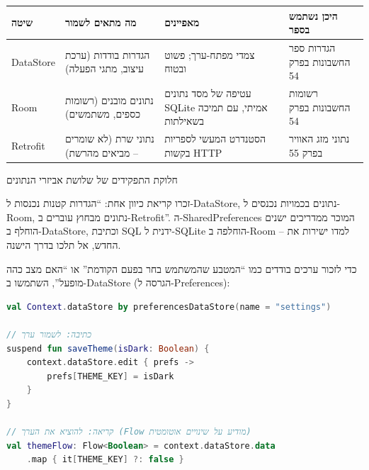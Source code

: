 


\begin{center}
\begin{tabularx}{\linewidth}{|X|X|X|X|}
\hline
\textbf{שיטה} & \textbf{מה מתאים לשמור} & \textbf{מאפיינים} & \textbf{היכן נשתמש בספר} \tabularnewline
\hline
DataStore & הגדרות בודדות (ערכת עיצוב, מתגי הפעלה) & צמדי מפתח-ערך; פשוט ובטוח & הגדרות ספר החשבונות בפרק 54 \tabularnewline
Room & נתונים מובנים (רשומות כספים, משתמשים) & עטיפה של מסד נתונים SQLite אמיתי, עם תמיכה בשאילתות & רשומות החשבונות בפרק 54 \tabularnewline
Retrofit & נתוני שרת (לא שומרים – מביאים מהרשת) & הסטנדרט המעשי לספריות בקשות HTTP & נתוני מזג האוויר בפרק 55 \tabularnewline
\hline
\end{tabularx}
\end{center}

\begin{center}\small\color{gray}חלוקת התפקידים של שלושת אביזרי הנתונים\end{center}

זכרו קריאת כיוון אחת: “הגדרות קטנות נכנסות ל-DataStore, נתונים בכמויות נכנסים ל-Room, נתונים מבחוץ עוברים ב-Retrofit”. ה-SharedPreferences המוכר ממדריכים ישנים הוחלף ב-DataStore, וכתיבת SQL ידנית ל-SQLite הוחלפה ב-Room – למדו ישירות את החדש, אל תלכו בדרך הישנה.


כדי לזכור ערכים בודדים כמו “המטבע שהמשתמש בחר בפעם הקודמת” או “האם מצב כהה מופעל”, השתמשו ב-DataStore (הגרסה ל-Preferences):

\begin{lstlisting}[language=Kotlin]
val Context.dataStore by preferencesDataStore(name = "settings")

// כתיבה: לשמור ערך
suspend fun saveTheme(isDark: Boolean) {
    context.dataStore.edit { prefs ->
        prefs[THEME_KEY] = isDark
    }
}

// קריאה: להוציא את הערך (‏Flow מודיע על שינויים אוטומטית)
val themeFlow: Flow<Boolean> = context.dataStore.data
    .map { it[THEME_KEY] ?: false }
\end{lstlisting}

